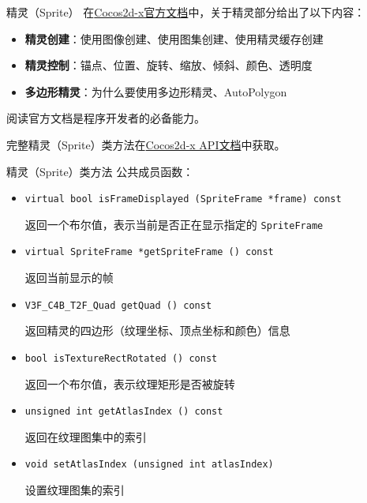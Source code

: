 \documentclass{beamer}
\newcommand{\hrefcol}[2]{\textcolor{cyan}{\href{#1}{#2}}}
\begin{document}
\begin{frame}[fragile]{精灵（Sprite）}
在\hrefcol{https://docs.cocos.com/cocos2d-x/manual/zh/sprites}{Cocos2d-x官方文档}中，关于精灵部分给出了以下内容：
\begin{itemize}
\item \textbf{精灵创建}：使用图像创建、使用图集创建、使用精灵缓存创建
\item \textbf{精灵控制}：锚点、位置、旋转、缩放、倾斜、颜色、透明度
\item \textbf{多边形精灵}：为什么要使用多边形精灵、AutoPolygon
\end{itemize}

\vspace{1em}

阅读官方文档是程序开发者的必备能力。

\vspace{1em}

完整精灵（Sprite）类方法在\hrefcol{https://docs.cocos2d-x.org/api-ref/cplusplus/v4x/d3/d5c/classcocos2d_1_1_sprite.html}{Cocos2d-x API文档}中获取。
\end{frame}


\begin{frame}[fragile]{精灵（Sprite）类方法}
公共成员函数：
\begin{itemize}
\item \texttt{virtual bool isFrameDisplayed (SpriteFrame *frame) const}

返回一个布尔值，表示当前是否正在显示指定的 \texttt{SpriteFrame}
\item \texttt{virtual SpriteFrame *getSpriteFrame () const}

返回当前显示的帧
\item \texttt{V3F\_C4B\_T2F\_Quad getQuad () const}

返回精灵的四边形（纹理坐标、顶点坐标和颜色）信息
\item \texttt{bool isTextureRectRotated () const}

返回一个布尔值，表示纹理矩形是否被旋转
\item \texttt{unsigned int getAtlasIndex () const}

返回在纹理图集中的索引
\item \texttt{void setAtlasIndex (unsigned int atlasIndex)}

设置纹理图集的索引
\end{itemize}
\end{frame}

\end{document}
